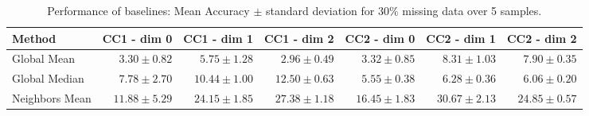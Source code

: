 \begin{table}[htbp]
  \centering
  \scriptsize{
  \begin{tabular}{lrrrrrr}
    \toprule
    Method   & CC1 - dim 0   & CC1 - dim 1   & CC1 - dim 2   & CC2 - dim 0  & CC2 - dim 1  & CC2 - dim 2 \\
    \midrule
    Global Mean & $3.30 \pm 0.82$ & $5.75\pm 1.28$  &$ 2.96\pm 0.49$  & $3.32 \pm 0.85$ & $8.31 \pm 1.03$  & $7.90\pm 0.35$\\
    Global Median & $7.78 \pm 2.70$   & $10.44 \pm 1.00$ &$ 12.50 \pm 0.63 $ & $5.55 \pm 0.38 $&$ 6.28\pm 0.36  $&$ 6.06\pm 0.20$\\
    Neighbors Mean & $11.88\pm 5.29 $& $24.15 \pm 1.85$ & $27.38 \pm 1.18  $& $16.45 \pm 1.83 $&$ 30.67\pm 2.13$   &$ 24.85 \pm 0.57 $\\
    \bottomrule
  \end{tabular}}
  \vspace{2pt}
  \caption{%
    Performance of baselines: Mean Accuracy $\pm$ standard deviation for $30\%$ missing data over 5 samples.
  }\label{table:comparison-SNN}
\end{table}

